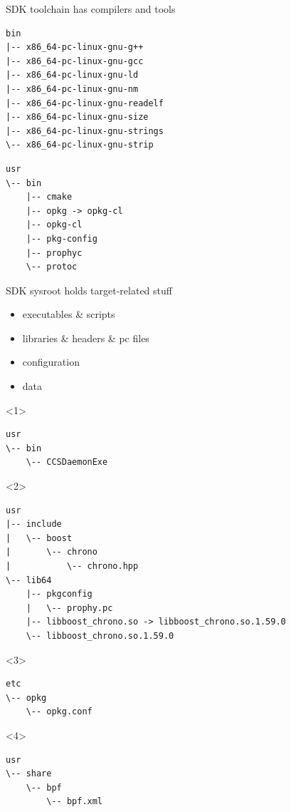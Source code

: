 \documentclass{beamer}
\begin{document}
\begin{frame}[fragile]{SDK toolchain has compilers and tools}
\begin{lstlisting}[style=Console]
bin
|-- x86_64-pc-linux-gnu-g++
|-- x86_64-pc-linux-gnu-gcc
|-- x86_64-pc-linux-gnu-ld
|-- x86_64-pc-linux-gnu-nm
|-- x86_64-pc-linux-gnu-readelf
|-- x86_64-pc-linux-gnu-size
|-- x86_64-pc-linux-gnu-strings
\-- x86_64-pc-linux-gnu-strip
\end{lstlisting}
\begin{lstlisting}[style=Console]
usr
\-- bin
    |-- cmake
    |-- opkg -> opkg-cl
    |-- opkg-cl
    |-- pkg-config
    |-- prophyc
    \-- protoc
\end{lstlisting}
\end{frame}

\begin{frame}[fragile, t]{SDK sysroot holds target-related stuff}
    \begin{block}{}
        \begin{itemize}
            \item<1->{executables \& scripts}
            \item<2->{libraries \& headers \& pc files}
            \item<3->{configuration}
            \item<4->{data}
        \end{itemize}
    \end{block}
    \begin{onlyenv}<1>
\begin{lstlisting}[style=Console]
usr
\-- bin
    \-- CCSDaemonExe
\end{lstlisting}
    \end{onlyenv}
    \begin{onlyenv}<2>
\begin{lstlisting}[style=Console]
usr
|-- include
|   \-- boost
|       \-- chrono
|           \-- chrono.hpp
\-- lib64
    |-- pkgconfig
    |   \-- prophy.pc
    |-- libboost_chrono.so -> libboost_chrono.so.1.59.0
    \-- libboost_chrono.so.1.59.0
\end{lstlisting}
    \end{onlyenv}
    \begin{onlyenv}<3>
\begin{lstlisting}[style=Console]
etc
\-- opkg
    \-- opkg.conf
\end{lstlisting}
    \end{onlyenv}
    \begin{onlyenv}<4>
\begin{lstlisting}[style=Console]
usr
\-- share
    \-- bpf
        \-- bpf.xml
\end{lstlisting}
    \end{onlyenv}
\end{frame}
\end{document}
